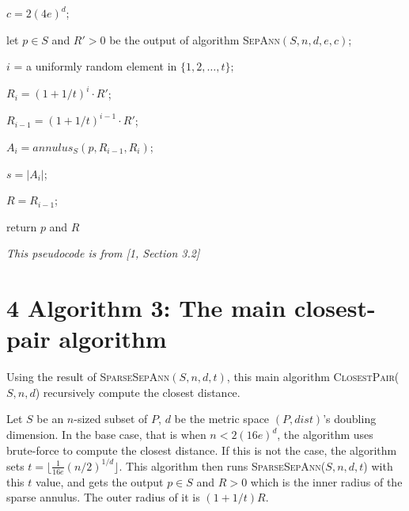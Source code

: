 \documentclass[12pt,english,]{article}
\let\origfigure\figure
\let\endorigfigure\endfigure
\renewenvironment{figure}[1][2] {
    \expandafter\origfigure\expandafter[H]
} {
    \endorigfigure
}
\begin{document}
\begin{figure}[ht] \centering
  \begin{minipage}{1\linewidth}
    {\LinesNotNumbered
    \begin{algorithm}[H]
    \SetAlgoLined
    \BlankLine

    \centering
    \begin{minipage}{.80\linewidth}
    $c = 2(4e)^d$;

    let $p\in S$ and $R' > 0$ be the output of algorithm \textsc{SepAnn$(S,n,d,e,c)$};

      {$i$ = a uniformly random element in $\{1, 2,\ldots, t\};$

      $R_i = (1+1/t)^i\cdot R'$;

      $R_{i-1} = (1+1/t)^{i-1}\cdot R'$;

      $A_i = annulus_S(p,R_{i-1},R_i)$;

      $s = |A_i|$;
      }
      $R = R_{i-1}$;

      return $p$ and $R$
    \end{minipage}
    \caption{\textsc{SparseSepAnn}$(S,n,d,t)$}
    \end{algorithm}}
  \end{minipage}
  \begin{minipage}{1\textwidth}
    \begin{flushright}
    {\footnotesize \emph{This pseudocode is from [1, Section 3.2]}\par}
    \end{flushright}
  \end{minipage}
\end{figure}

\hypertarget{section4}{%
\section{\texorpdfstring{4 \enspace Algorithm 3: The main closest-pair
algorithm}{4 Algorithm 3: The main closest-pair algorithm}}\label{section4}}

Using the result of \textsc{SparseSepAnn$(S,n,d,t)$}, this main
algorithm \textsc{ClosestPair($S,n,d$)} recursively compute the closest
distance.

Let \(S\) be an \(n\)-sized subset of \(P\), \(d\) be the metric space
\((P, dist)\)'s doubling dimension. In the base case, that is when
\(n < 2(16e)^d\), the algorithm uses brute-force to compute the closest
distance. If this is not the case, the algorithm sets
\(t = \lfloor \frac{1}{16e}(n/2)^{1/d}\rfloor\). This algorithm then
runs \textsc{SparseSepAnn($S,n,d,t$)} with this \(t\) value, and gets
the output \(p \in S\) and \(R>0\) which is the inner radius of the
sparse annulus. The outer radius of it is \((1+1/t)R\).
\end{document}
